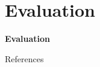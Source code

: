 \documentclass[en]{sdqbeamer}
\begin{document}
\section{Evaluation}
\begin{frame}
	\centering\textbf{\LARGE{Evaluation}}
\end{frame}

\appendix
\beginbackup
\begin{frame}{References}
	\printbibliography
\end{frame}

\backupend
\end{document}
